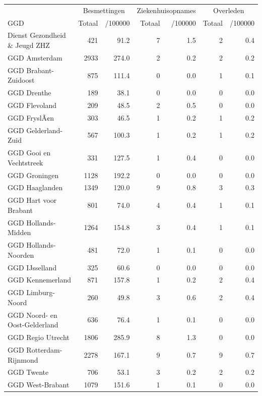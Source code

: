 \documentclass[
  english,
  man,floatsintext]{apa6}
\begin{document}
\begin{table}
\centering\begingroup\fontsize{10}{12}\selectfont

\begin{threeparttable}
\begin{tabular}{lrrrrrr}
\toprule
\multicolumn{1}{c}{ } & \multicolumn{2}{c}{Besmettingen} & \multicolumn{2}{c}{Ziekenhuisopnames} & \multicolumn{2}{c}{Overleden} \\
\cmidrule(l{3pt}r{3pt}){2-3} \cmidrule(l{3pt}r{3pt}){4-5} \cmidrule(l{3pt}r{3pt}){6-7}
GGD & Totaal & /100000 & Totaal & /100000 & Totaal & /100000\\
\midrule
Dienst Gezondheid \& Jeugd ZHZ & 421 & 91.2 & 7 & 1.5 & 2 & 0.4\\
GGD Amsterdam & 2933 & 274.0 & 2 & 0.2 & 2 & 0.2\\
GGD Brabant-Zuidoost & 875 & 111.4 & 0 & 0.0 & 1 & 0.1\\
GGD Drenthe & 189 & 38.1 & 0 & 0.0 & 0 & 0.0\\
GGD Flevoland & 209 & 48.5 & 2 & 0.5 & 0 & 0.0\\
GGD FryslÃ¢n & 303 & 46.5 & 1 & 0.2 & 1 & 0.2\\
GGD Gelderland-Zuid & 567 & 100.3 & 1 & 0.2 & 1 & 0.2\\
GGD Gooi en Vechtstreek & 331 & 127.5 & 1 & 0.4 & 0 & 0.0\\
GGD Groningen & 1128 & 192.2 & 0 & 0.0 & 0 & 0.0\\
GGD Haaglanden & 1349 & 120.0 & 9 & 0.8 & 3 & 0.3\\
GGD Hart voor Brabant & 801 & 74.0 & 4 & 0.4 & 1 & 0.1\\
GGD Hollands-Midden & 1264 & 154.8 & 3 & 0.4 & 1 & 0.1\\
GGD Hollands-Noorden & 481 & 72.0 & 1 & 0.1 & 0 & 0.0\\
GGD IJsselland & 325 & 60.6 & 0 & 0.0 & 0 & 0.0\\
GGD Kennemerland & 871 & 157.8 & 1 & 0.2 & 2 & 0.4\\
GGD Limburg-Noord & 260 & 49.8 & 3 & 0.6 & 2 & 0.4\\
GGD Noord- en Oost-Gelderland & 636 & 76.4 & 1 & 0.1 & 0 & 0.0\\
GGD Regio Utrecht & 1806 & 285.9 & 8 & 1.3 & 0 & 0.0\\
GGD Rotterdam-Rijnmond & 2278 & 167.1 & 9 & 0.7 & 9 & 0.7\\
GGD Twente & 706 & 53.1 & 3 & 0.2 & 2 & 0.2\\
GGD West-Brabant & 1079 & 151.6 & 1 & 0.1 & 0 & 0.0\\

\end{tabular}
\end{threeparttable}
\end{table}
\end{document}
